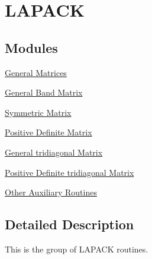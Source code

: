\hypertarget{group__lapack}{}\section{L\+A\+P\+A\+C\+K}
\label{group__lapack}
\subsection*{Modules}
\begin{DoxyCompactItemize}
\item 
\hyperlink{group__GE}{General Matrices}
\item 
\hyperlink{group__GB}{General Band Matrix}
\item 
\hyperlink{group__SY}{Symmetric Matrix}
\item 
\hyperlink{group__PO}{Positive Definite Matrix}
\item 
\hyperlink{group__GT}{General tridiagonal Matrix}
\item 
\hyperlink{group__PT}{Positive Definite tridiagonal Matrix}
\item 
\hyperlink{group__auxOTHERauxiliary}{Other Auxiliary Routines}
\end{DoxyCompactItemize}


\subsection{Detailed Description}
This is the group of L\+A\+P\+A\+C\+K routines. 